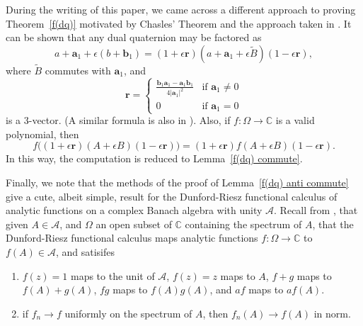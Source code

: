 \documentclass[12pt,reqno]{amsart}
\begin{document}
During the writing of this paper, we came across a different approach to proving Theorem~\ref{f(dq)} motivated by Chasles' Theorem and the approach taken in \cite{wang-et-al}.  It can be shown that any dual quaternion may be factored as
\begin{equation}
a + \bm a_1 + \epsilon (b + \bm b_1) = (1 + \epsilon \bm r) (a + \bm a_1 + \epsilon \tilde B) (1 - \epsilon \bm r),
\end{equation}
where $\tilde B$ commutes with $\bm a_1$, and
\begin{equation}
\bm r = \begin{cases} \frac{\bm b_1 \bm a_1 - \bm a_1 \bm b_1 }{4|\bm a_1|^2} & \text{if $\bm a_1 \ne 0$} \\ 0 & \text{if $\bm a_1 = 0$} \end{cases}
\end{equation}
is a 3-vector.  (A similar formula is also in \cite{selig}).  Also, if $f:\Omega \to \mathbb C$ is a valid polynomial, then
\begin{equation}
f\bigl((1 + \epsilon \bm r) (A + \epsilon B) (1 - \epsilon \bm r)\bigr) = (1 + \epsilon \bm r) f(A + \epsilon B) (1 - \epsilon \bm r) .
\end{equation}
In this way, the computation is reduced to Lemma~\ref{f(dq) commute}.

\bigskip

Finally, we note that the methods of the proof of Lemma~\ref{f(dq) anti commute} give a cute, albeit simple, result for the Dunford-Riesz functional calculus of analytic functions on a complex Banach algebra with unity $\mathcal A$.  Recall from \cite{dunford-et-al}, that given $A \in \mathcal A$, and $\Omega$ an open subset of $\mathbb C$ containing the spectrum of $A$, that the Dunford-Riesz functional calculus maps analytic functions $f : \Omega \to \mathbb C$ to $f(A) \in \mathcal A$, and satisifes
\begin{enumerate}
\item $f(z) = 1$ maps to the unit of $\mathcal A$, $f(z) = z$ maps to $A$, $f+g$ maps to $f(A) + g(A)$, $fg$ maps to $f(A) g(A)$, and $a f$ maps to $a f(A)$.
\item if $f_n \to f$ uniformly on the spectrum of $A$, then $f_n(A) \to f(A)$ in norm.
\end{enumerate}
\end{document}
